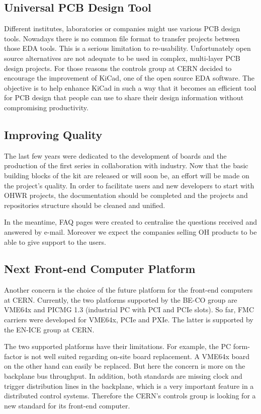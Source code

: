\documentclass{JAC2003}
\begin{document}
\subsection{Universal PCB Design Tool}
Different institutes, laboratories or companies might use various PCB design tools.
Nowadays there is no common file format to transfer projects between those EDA tools.
This is a serious limitation to re-usability.
Unfortunately open source alternatives are not adequate to be used in complex, multi-layer PCB design projects.
For those reasons the controls group at CERN decided to encourage the improvement of KiCad, one of the open source EDA software.
The objective is to help enhance KiCad in such a way that it becomes an efficient tool for PCB design that people can use to share their design information without compromising productivity.

\subsection{Improving Quality}
The last few years were dedicated to the development of boards and the production of the first series in collaboration with industry.
Now that the basic building blocks of the kit are released or will soon be, an effort will be made on the project's quality.
In order to facilitate users and new developers to start with OHWR projects, the documentation should be completed and the projects and repositories structure should be cleaned and unified.

In the meantime, FAQ pages were created to centralise the questions received and answered by e-mail.
Moreover we expect the companies selling OH products to be able to give support to the users.

\subsection{Next Front-end Computer Platform}
Another concern is the choice of the future platform for the front-end computers at CERN.
Currently, the two platforms supported by the BE-CO group are VME64x and PICMG 1.3 (industrial PC with PCI and PCIe slots).
So far, FMC carriers were developed for VME64x, PCIe and PXIe.
The latter is supported by the EN-ICE group at CERN.

The two supported platforms have their limitations.
For example, the PC form-factor is not well suited regarding on-site board replacement.
A VME64x board on the other hand can easily be replaced.
But here the concern is more on the backplane bus throughput.
In addition, both standards are missing clock and trigger distribution lines in the backplane, which is a very important feature in a distributed control systems.
Therefore the CERN's controls group is looking for a new standard for its front-end computer.
\end{document}
